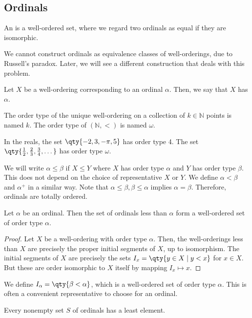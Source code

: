 \subsection{Ordinals}
\begin{definition}
    An  is a well-ordered set, where we regard two ordinals as equal if they are isomorphic.
\end{definition}
\begin{remark}
    We cannot construct ordinals as equivalence classes of well-orderings, due to Russell's paradox.
    Later, we will see a different construction that deals with this problem.
\end{remark}
\begin{definition}
    Let $X$ be a well-ordering corresponding to an ordinal $\alpha$.
    Then, we say that $X$ has  $\alpha$.
\end{definition}
The order type of the unique well-ordering on a collection of $k \in \mathbb N$ points is named $k$.
The order type of $(\mathbb N, <)$ is named $\omega$.
\begin{example}
    In the reals, the set $\qty{-2, 3, -\pi, 5}$ has order type 4.
    The set $\qty{\frac{1}{2}, \frac{2}{3}, \frac{3}{4}, \dots}$ has order type $\omega$.
\end{example}
We will write $\alpha \leq \beta$ if $X \leq Y$ where $X$ has order type $\alpha$ and $Y$ has order type $\beta$.
This does not depend on the choice of representative $X$ or $Y$.
We define $\alpha < \beta$ and $\alpha^+$ in a similar way.
Note that $\alpha \leq \beta, \beta \leq \alpha$ implies $\alpha = \beta$.
Therefore, ordinals are totally ordered.
\begin{proposition}
    Let $\alpha$ be an ordinal.
    Then the set of ordinals less than $\alpha$ form a well-ordered set of order type $\alpha$.
\end{proposition}
\begin{proof}
    Let $X$ be a well-ordering with order type $\alpha$.
    Then, the well-orderings less than $X$ are precisely the proper initial segments of $X$, up to isomorphism.
    The initial segments of $X$ are precisely the sets $I_x = \qty{y \in X \mid y < x}$ for $x \in X$.
    But these are order isomorphic to $X$ itself by mapping $I_x \mapsto x$.
\end{proof}
We define $I_\alpha = \qty{\beta < \alpha}$, which is a well-ordered set of order type $\alpha$.
This is often a convenient representative to choose for an ordinal.
\begin{proposition}
    Every nonempty set $S$ of ordinals has a least element.
\end{proposition}
